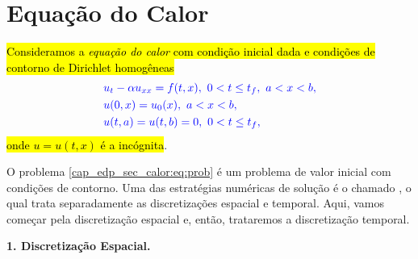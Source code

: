 \section{Equação do Calor}\label{cap_edp_sec_calor}

\hl{Consideramos a \emph{equação do calor} com condição inicial dada e condições de contorno de Dirichlet homogêneas}
\begin{subequations}\label{cap_edp_sec_calor:eq:prob}\hleq
  \begin{align}
    &u_t - \alpha u_{xx} = f(t,x), ~0<t\leq t_f, ~a<x<b, \label{cap_edp_sec_calor:eq:calor}\\
    &u(0,x) = u_0(x), ~a < x < b,\label{edp_calor_eq:eq:ci}\\
    &u(t,a) = u(t,b) = 0, ~0<t\leq t_f,\label{edp_calor_eq:eq:bc}
  \end{align}
\end{subequations}
\hl{onde $u = u(t,x)$ é a incógnita}.

O problema {\eqref{cap_edp_sec_calor:eq:prob}} é um problema de valor inicial com condições de contorno. Uma das estratégias numéricas de solução é o chamado , o qual trata separadamente as discretizações espacial e temporal. Aqui, vamos começar pela discretização espacial e, então, trataremos a discretização temporal.

\begin{flushleft}
  \textbf{1. Discretização Espacial.}
\end{flushleft}

